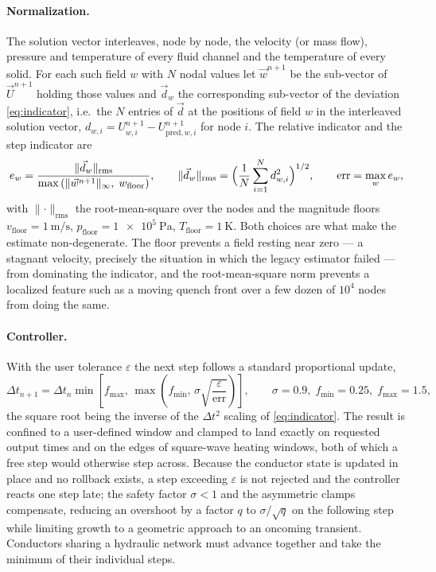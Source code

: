\documentclass[11pt,a4paper]{article}
\begin{document}
\paragraph{Normalization.}
The solution vector interleaves, node by node, the velocity (or mass flow),
pressure and temperature of every fluid channel and the temperature of every
solid. For each such field $w$ with $N$ nodal values let $\vec{w}^{n+1}$ be the
sub-vector of $\vec{U}^{n+1}$ holding those values and $\vec{d}_w$ the
corresponding sub-vector of the deviation \eqref{eq:indicator}, i.e.\ the $N$
entries of $\vec{d}$ at the positions of field $w$ in the interleaved solution
vector, $d_{w,i} = U^{n+1}_{w,i} - U^{n+1}_{\mathrm{pred},w,i}$ for node $i$.
The relative indicator and the step indicator are
%
\begin{equation}
	e_w = \frac{\lVert \vec{d}_w \rVert_{\mathrm{rms}}}
	{\max \left( \lVert \vec{w}^{n+1} \rVert_\infty,\; w_\mathrm{floor} \right)},
	\qquad
	\lVert \vec{d}_w \rVert_{\mathrm{rms}} = \Bigl( \frac{1}{N} \sum_{i=1}^{N} d_{w,i}^2 \Bigr)^{1/2},
	\qquad
	\mathrm{err} = \max_w e_w ,
	\label{eq:normalization}
\end{equation}
%
with $\lVert \cdot \rVert_\mathrm{rms}$ the root-mean-square over the nodes and
the magnitude floors $v_\mathrm{floor} = \SI{1}{\metre\per\second}$,
$p_\mathrm{floor} = \SI{1e5}{\pascal}$, $T_\mathrm{floor} = \SI{1}{\kelvin}$.
Both choices are what make the estimate non-degenerate. The floor prevents a
field resting near zero --- a stagnant velocity, precisely the situation in
which the legacy estimator failed --- from dominating the indicator, and the
root-mean-square norm prevents a localized feature such as a moving quench front
over a few dozen of $10^4$ nodes from doing the same.

\paragraph{Controller.}
With the user tolerance $\varepsilon$ the next step follows a standard
proportional update,
%
\begin{equation}
	\Delta t_{n+1} = \Delta t_n \min \left[ f_\mathrm{max},\,
	\max \left( f_\mathrm{min},\, \sigma \sqrt{\frac{\varepsilon}{\mathrm{err}}} \right) \right],
	\qquad \sigma = 0.9,\; f_\mathrm{min} = 0.25,\; f_\mathrm{max} = 1.5,
	\label{eq:controller}
\end{equation}
%
the square root being the inverse of the $\Delta t^2$ scaling of
\eqref{eq:indicator}. The result is confined to a user-defined window and
clamped to land exactly on requested output times and on the edges of
square-wave heating windows, both of which a free step would otherwise step
across. Because the conductor state is updated in place and no rollback exists,
a step exceeding $\varepsilon$ is not rejected and the controller reacts one
step late; the safety factor $\sigma < 1$ and the asymmetric clamps compensate,
reducing an overshoot by a factor $q$ to $\sigma / \sqrt{q}$ on the following
step while limiting growth to a geometric approach to an oncoming transient.
Conductors sharing a hydraulic network must advance together and take the
minimum of their individual steps.
\end{document}
